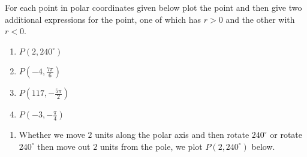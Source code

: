 \documentclass{ximera}
\begin{document}
\begin{example} \label{plotpolarex} For each point in polar coordinates given below plot the point and then give two additional expressions for the point, one of which has $r > 0$ and the other with $r < 0$. 

\begin{enumerate}

\item  $P\left(2, 240^{\circ}\right)$

\item  $P\left(-4, \frac{7\pi}{6} \right)$

\item  $P\left(117, -\frac{5\pi}{2} \right)$

\item  $P\left(-3, -\frac{\pi}{4} \right)$

\end{enumerate}

\begin{explanation}

\begin{enumerate}

\item  Whether we move $2$ units along the polar axis and then rotate $240^{\circ}$ or rotate $240^{\circ}$ then move out $2$ units from the pole, we plot  $P\left(2, 240^{\circ}\right)$  below. 

\begin{image}
\end{image}
\end{enumerate}
\end{explanation}
\end{example}
\end{document}
